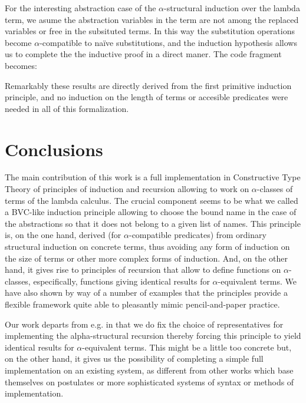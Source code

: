 \documentclass{entcs}
\newcommand{\alp}{\ensuremath{\alpha}}
\begin{document}
 \hspace{5px}

\noindent For the interesting abstraction case of the \alp-structural induction over the lambda term, we asume the abstraction variables in the term are not among the replaced variables or free in the subsituted terms. In this way the substitution operations become \alp-compatible to na\"ive substitutions, and the induction hypothesis allows us to complete the the inductive proof in a direct maner. The code fragment becomes:
 
 \hspace{5px}

Remarkably these results are directly derived from the first primitive induction principle, and no induction on the length of terms or accesible predicates were needed in all of this formalization.

\section{Conclusions}
The main contribution of this work is a full implementation in Constructive Type Theory of principles of induction and recursion allowing to work on $\alpha$-classes of terms of the lambda calculus. The crucial component seems to be what we called a BVC-like induction principle allowing to choose the bound name in the case of the abstractions so that it does not belong to a given list of names. This principle is, on the one hand, derived (for $\alpha$-compatible predicates) from ordinary structural induction on concrete terms, thus avoiding any form of induction on the size of terms or other more complex forms of induction. And, on the other hand, it gives rise to principles of recursion that allow to define functions on $\alpha$-classes, especifically, functions giving identical results for $\alpha$-equivalent terms. We have also shown by way of a number of examples that the principles provide a flexible framework quite able to pleasantly mimic pencil-and-paper practice.

Our work departs from e.g. \cite{Pitts2} in that we do fix the choice of representatives for implementing the alpha-structural recursion thereby forcing this principle to yield identical results for $\alpha$-equivalent terms. This might be a little too concrete  but, on the other hand, it gives us the possibility of completing a simple full implementation on an existing system, as different from other works which base themselves on postulates or more sophisticated systems of syntax or methods of implementation.
\end{document}
